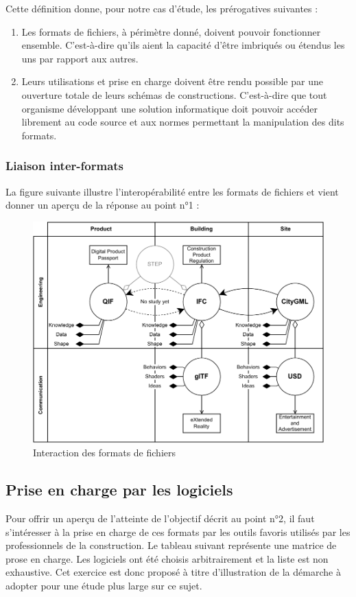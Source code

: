 \documentclass[a4paper,12pt]{article}
\begin{document}
Cette définition donne, pour notre cas d'étude, les prérogatives suivantes :
\begin{enumerate}
\item Les formats de fichiers, à périmètre donné, doivent pouvoir fonctionner ensemble. C'est-à-dire qu'ils aient la capacité d'être imbriqués ou étendus les uns par rapport aux autres.
\item Leurs utilisations et prise en charge doivent être rendu possible par une ouverture totale de leurs schémas de constructions. C'est-à-dire que tout organisme développant une solution informatique doit pouvoir accéder librement au code source et aux normes permettant la manipulation des dits formats.
\end{enumerate}
\subsubsection*{Liaison inter-formats}
\label{sec:orgfdc5241}

La figure suivante illustre l'interopérabilité entre les formats de fichiers et vient donner un aperçu de la réponse au point n°1 :

\begin{figure}
\centering
\includegraphics[width=.9\linewidth]{./imports/3DFiles_Intrication.pdf}
\caption{\label{fig:org95e8bc4}Interaction des formats de fichiers}
\end{figure}
\subsection*{Prise en charge par les logiciels}
\label{sec:org99482d3}

Pour offrir un aperçu de l'atteinte de l'objectif décrit au point n°2, il faut s'intéresser à la prise en charge de ces formats par les outils favoris utilisés par les professionnels de la construction. Le tableau suivant représente une matrice de prose en charge. Les logiciels ont été choisis arbitrairement et la liste est non exhaustive. Cet exercice est donc proposé à titre d'illustration de la démarche à adopter pour une étude plus large sur ce sujet.
\end{document}
